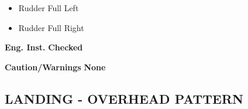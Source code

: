 \documentclass[fontSpartan]{TechCheck}
\begin{document}
\begin{longtablenumerate}
{\begin{subenumerate}
\begin{itemize}
				\item Rudder Full Left
				\item Rudder Full Right
			\end{itemize}
			\item \textbf{Eng. Inst.} \dotfill \textbf{Checked}
			\item \textbf{Caution/Warnings}  \dotfill\textbf{None}
		\end{subenumerate}}
	\end{longtablenumerate}

	\subsection{LANDING - OVERHEAD PATTERN}
	\begin{center}
	\end{center}
\end{document}
